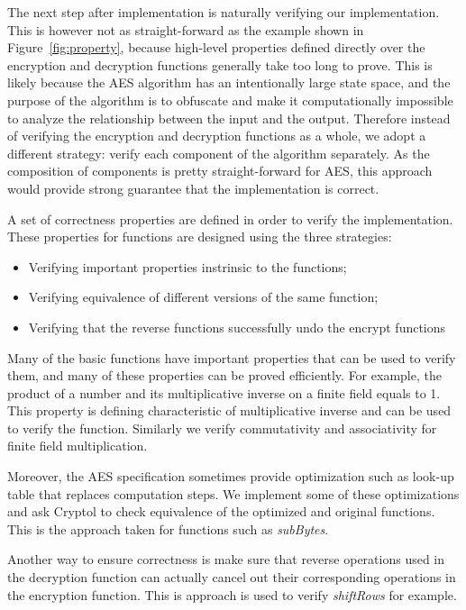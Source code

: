 \documentclass[a4paper, notitlepage]{report}
\begin{document}
The next step after implementation is naturally verifying our implementation.
This is however not as straight-forward as the example shown in
Figure~\ref{fig:property}, because high-level properties defined directly over
the encryption and decryption functions generally take too long to prove.
This is likely because the AES algorithm has an intentionally large state space,
and the purpose of the algorithm is to obfuscate and make it computationally impossible
to analyze the relationship between the input and the output.
Therefore instead of verifying the encryption and decryption functions as a whole,
we adopt a different strategy: verify each component of the algorithm separately.
As the composition of components is pretty straight-forward for AES, this approach
would provide strong guarantee that the implementation is correct.

A set of correctness properties are defined in order to verify the implementation.
These properties for functions are designed using the three strategies:
\begin{itemize}
\item Verifying important properties instrinsic to the functions;
\item Verifying equivalence of different versions of the same function;
\item Verifying that the reverse functions successfully undo the encrypt functions
\end{itemize} 

Many of the basic functions have important properties that can be used to verify
them, and many of these properties can be proved efficiently. For example, the
product of a number and its multiplicative inverse on a finite field equals to 1.
This property is defining characteristic of multiplicative inverse and can be used
to verify the function. Similarly we verify commutativity and associativity for
finite field multiplication.

Moreover, the AES specification sometimes provide optimization such as look-up table
that replaces computation steps. We implement some of these optimizations and
ask Cryptol to check equivalence of the optimized and original functions. This is
the approach taken for functions such as \emph{subBytes}.

Another way to ensure correctness is make sure that reverse operations used in the
decryption function can actually cancel out their corresponding operations in
the encryption function. This is approach is used to verify \emph{shiftRows} for
example.
\end{document}
